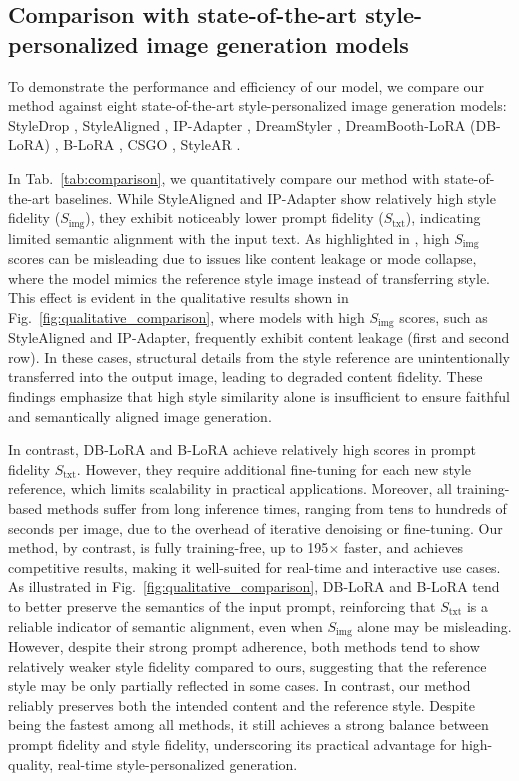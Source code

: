 \documentclass[10pt,twocolumn,letterpaper]{article}
\newcommand{\figref}[1]{Fig.~\ref{#1}}
\newcommand{\tabref}[1]{Tab.~\ref{#1}}
\begin{document}
\subsection{Comparison with state-of-the-art style-personalized image generation models}

To demonstrate the performance and efficiency of our model, we compare our method against eight state-of-the-art style-personalized image generation models: StyleDrop \cite{sohn2023styledrop}, StyleAligned \cite{hertz2024stylealignedimagegeneration}, IP-Adapter \cite{ye2023ipadaptertextcompatibleimage}, DreamStyler \cite{ahn2024dreamstyler}, DreamBooth-LoRA (DB-LoRA) \cite{ryu2023low}, B-LoRA \cite{frenkel2024implicitstylecontentseparationusing}, CSGO \cite{xing2024csgo}, StyleAR \cite{wu2025stylear}. 

In \tabref{tab:comparison}, we quantitatively compare our method with state-of-the-art baselines. While StyleAligned and IP-Adapter show relatively high style fidelity ($S_{\text{img}}$), they exhibit noticeably lower prompt fidelity ($S_{\text{txt}}$), indicating limited semantic alignment with the input text. As highlighted in \cite{zhang2024finestyle}, high $S_{\text{img}}$ scores can be misleading due to issues like content leakage or mode collapse, where the model mimics the reference style image instead of transferring style.
This effect is evident in the qualitative results shown in \figref{fig:qualitative_comparison}, where models with high $S_{\text{img}}$ scores, such as StyleAligned and IP-Adapter, frequently exhibit content leakage (first and second row). In these cases, structural details from the style reference are unintentionally transferred into the output image, leading to degraded content fidelity. These findings emphasize that high style similarity alone is insufficient to ensure faithful and semantically aligned image generation.

In contrast, DB-LoRA and B-LoRA achieve relatively high scores in prompt fidelity $S_\text{txt}$. However, they require additional fine-tuning for each new style reference, which limits scalability in practical applications. Moreover, all training-based methods suffer from long inference times, ranging from tens to hundreds of seconds per image, due to the overhead of iterative denoising or fine-tuning. Our method, by contrast, is fully training-free, up to 195$\times$ faster, and achieves competitive results, making it well-suited for real-time and interactive use cases.
As illustrated in \figref{fig:qualitative_comparison}, DB-LoRA and B-LoRA tend to better preserve the semantics of the input prompt, reinforcing that $S_{\text{txt}}$ is a reliable indicator of semantic alignment, even when $S_{\text{img}}$ alone may be misleading. However, despite their strong prompt adherence, both methods tend to show relatively weaker style fidelity compared to ours, suggesting that the reference style may be only partially reflected in some cases. In contrast, our method reliably preserves both the intended content and the reference style. Despite being the fastest among all methods, it still achieves a strong balance between prompt fidelity and style fidelity, underscoring its practical advantage for high-quality, real-time style-personalized generation.
\end{document}
